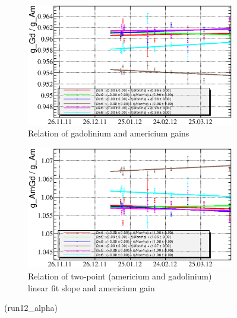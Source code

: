 \documentclass[a4paper,12pt]{article}
\begin{document}
\begin{figure}[h]
\begin{subfigure}[b]{0.5\textwidth}
\includegraphics[width=\textwidth]{gfx/run12_alpha/Y2U/c_chGdGain_over_AmGain_by_day_Y2U.eps}
\caption{Relation of gadolinium and americium gains}
\end{subfigure}
\begin{subfigure}[b]{0.5\textwidth}
\includegraphics[width=\textwidth]{gfx/run12_alpha/Y2U/c_chAmGdGain_over_AmGain_by_day_Y2U.eps}
\caption{Relation of two-point (americium and gadolinium) linear fit slope and americium gain}
\end{subfigure}
\caption{\gainrealationslabel (run12\_alpha)}
\end{figure}
\end{document}
